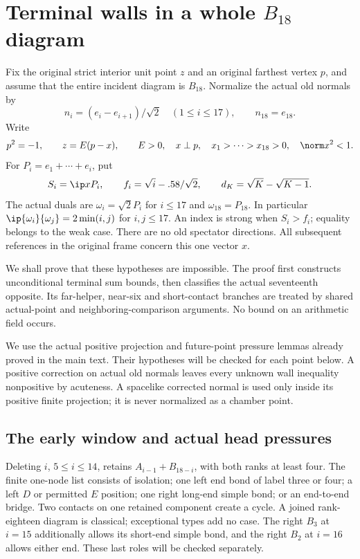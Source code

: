 
\section{Terminal walls in a whole \(B_{18}\) diagram}
\label{app:wholeB18}
Fix the original strict interior unit point \(z\) and an original
farthest vertex \(p\), and assume that the entire incident diagram
is \(B_{18}\). Normalize the actual old normals by
\[
 n_i=(e_i-e_{i+1})/\sqrt2\quad(1\leq i\leq17),\qquad n_{18}=e_{18}.
\]
Write
\[
 p^2=-1,\qquad z=E(p-x),\qquad E>0,\quad x\perp p,\quad
 x_1>\cdots>x_{18}>0,\quad \norm x^2<1.
\]
For \(P_i=e_1+\cdots+e_i\), put
\[
 S_i=\ip x{P_i},\qquad f_i=\sqrt i-.58/\sqrt2,\qquad
 d_K=\sqrt K-\sqrt{K-1}.
\]
The actual duals are \(\omega_i=\sqrt2P_i\) for \(i\leq17\)
and \(\omega_{18}=P_{18}\). In particular
\(\ip{\omega_i}{\omega_j}=2\min(i,j)\) for \(i,j\leq17\).
An index is strong when \(S_i>f_i\); equality belongs to the weak case.
There are no old spectator directions. All subsequent references
in the original frame concern this one vector \(x\).

We shall prove that these hypotheses are impossible. The proof first
constructs unconditional terminal sum bounds, then classifies the actual
seventeenth opposite. Its far-helper, near-six and short-contact branches
are treated by shared actual-point and neighboring-comparison arguments.
No bound on an arithmetic field occurs.

We use the actual positive projection and future-point pressure lemmas
already proved in the main text. Their hypotheses will be checked for
each point below. A positive correction on actual old normals leaves
every unknown wall inequality nonpositive by acuteness. A spacelike
corrected normal is used only inside its positive finite projection;
it is never normalized as a chamber point.

\subsection{The early window and actual head pressures}
\label{app:B18bulk}
Deleting \(i\), \(5\leq i\leq14\), retains
\(A_{i-1}+B_{18-i}\), with both ranks at least four.
The finite one-node list consists of isolation; one left end bond
of label three or four; a left \(D\) or permitted \(E\) position;
one right long-end simple bond; or an end-to-end bridge.
Two contacts on one retained component create a cycle. A joined
rank-eighteen diagram is classical; exceptional types add no case.
The right \(B_3\) at \(i=15\) additionally allows its short-end
simple bond, and the right \(B_2\) at \(i=16\) allows either end.
These last roles will be checked separately.

